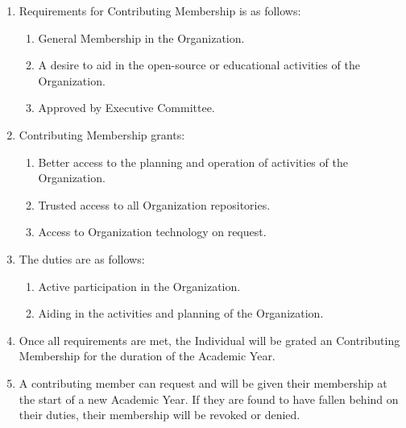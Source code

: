 \begin{enumerate}
	\item Requirements for Contributing Membership is as follows:
		\begin{enumerate}
			\item General Membership in the Organization.

			\item A desire to aid in the open-source or educational activities of the Organization.

			\item Approved by Executive Committee.
		\end{enumerate}

	\item Contributing Membership grants:
		\begin{enumerate}
			\item Better access to the planning and operation of activities of the Organization.

			\item Trusted access to all Organization repositories.

			\item Access to Organization technology on request.
		\end{enumerate}

	\item The duties are as follows:
		\begin{enumerate}
			\item Active participation in the Organization.

			\item Aiding in the activities and planning of the Organization.
		\end{enumerate}

	\item Once all requirements are met, the Individual will be grated an
		Contributing Membership for the duration of the Academic Year.

	\item A contributing member can request and will be given their membership at the
		start of a new Academic Year. If they are found to have fallen behind on
		their duties, their membership will be revoked or denied.
\end{enumerate}

